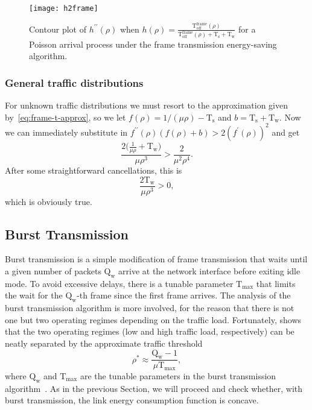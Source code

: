 \documentclass[journal,english,twocolumn,10pt,letterpaper]{IEEEtran}
\newcommand{\added}[1]{{#1}}
\newcommand{\Constantconstant}[2]{\mathrm{#1}_{\mathrm{#2}}}
\newcommand{\Ts}{\Constantconstant T s}
\newcommand{\Tw}{\Constantconstant T w}
\newcommand{\Qw}{\Constantconstant Q w}
\newcommand{\Tmax}{\Constantconstant T \max}
\newcommand{\Toff}{\mathrm{T}_{\mathrm{off}}}
\begin{document}
\begin{figure}
  \centering
  \texttt{[image: h2frame]}
  \caption{\label{fig:numerical} Contour plot of $h^{\prime\prime}(\rho)$ when
    $h(\rho) =
    \frac{\Toff^{\text{frame}}(\rho)}{\Toff^{\text{frame}}(\rho) +
      \Ts + \Tw}$ for a Poisson arrival process under the frame
    transmission energy-saving algorithm.}
\end{figure}

\subsubsection{General traffic distributions}
\label{sec:gener-traff-distr}

For unknown traffic distributions we must resort to the approximation given
by~\eqref{eq:frame-t-approx}, so we let $f(\rho) = 1/(\mu \rho) - \Ts$ and
$b = \Ts + \Tw$. Now we can immediately substitute in
$f^{\prime\prime}(\rho) (f(\rho) + b) > 2( f^\prime(\rho))^2$ and get
\begin{equation}
  \frac{2 \bigl( \frac{1}{\mu\rho} + \Tw \bigr)}{\mu \rho^3} >
  \frac{2}{\mu^2 \rho^4}.
\end{equation}
After some straightforward cancellations, this is 
\begin{equation}
  \frac{2 \Tw}{\mu \rho^3} > 0,
\end{equation}
which is obviously true.

\subsection{Burst Transmission}

Burst transmission is a simple modification of frame transmission that waits
until a given number of packets $\Qw$ arrive at the network interface before
exiting idle mode. To avoid excessive delays, there is a tunable parameter
$\Tmax$ that limits the wait for the $\Qw$-th frame since the first frame
arrives. The analysis of the burst transmission algorithm is more involved,
for the reason that there is not one but two operating regimes depending on
the traffic load. Fortunately,
\added{\cite{herreria12:_gi_g_model_gb_energ_effic_ether} shows that} the two
operating regimes (low and high traffic load, respectively) can be neatly
separated by the approximate traffic threshold
\begin{equation}
  \rho^\ast \approx \frac{\Qw  - 1}{\mu \Tmax},
\end{equation}
where $\Qw$ and $\Tmax$ are the tunable parameters in the burst transmission
algorithm~\cite{herreria11:_power_savin_model_burst_trans}. As in the previous
Section, we will proceed and check whether, with burst transmission, the link
energy consumption function is concave.
\end{document}
